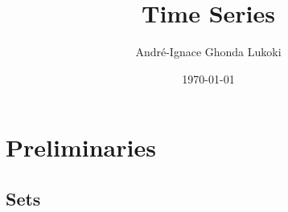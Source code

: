 \documentclass{article}
\title{Time Series}
\author{André-Ignace Ghonda Lukoki}
\date{\today}
\begin{document}
    \maketitle
    \section{Preliminaries} 
    \subsection{Sets}

    
\end{document}

